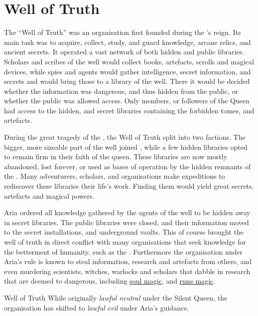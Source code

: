 \section{Well of Truth}
\label{sec:Well of Truth}

The ``Well of Truth'' was an organisation first founded during the
's reign. Its main task was to acquire, collect,
study, and guard knowledge, arcane relics, and ancient secrets. It operated a
vast network of both hidden and public libraries. Scholars and scribes of the
well would collect books, artefacts, scrolls and magical devices, while spies
and agents would gather intelligence, secret information, and secrets and
would bring those to a library of the well. There it would be decided whether
the information was dangerous, and thus hidden from the public, or whether the
public was allowed access. Only members, or followers of the Queen had access
to the hidden, and secret libraries containing the forbidden tomes, and
artefacts.

During the great tragedy of the , the Well of Truth
split into two factions. The bigger, more sizeable part of the well joined
, while a few hidden libraries opted to remain firm in their
faith of the queen. These libraries are now mostly abandoned, lost forever, or
used as bases of operation by the hidden remnants of the . Many adventurers, scholars, and organisations make expeditions
to rediscover these libraries their life's work. Finding them would yield
great secrets, artefacts and magical powers.

Aria ordered all knowledge gathered by the agents of the well to be hidden
away in secret libraries. The public libraries were closed, and their
information moved to the secret installations, and underground vaults. This
of course brought the well of truth in direct conflict with many organisations
that seek knowledge for the betterment of humanity, such as the
. Furthermore the organisation under Aria's rule is
known to steal information, research and artefacts from others, and even
murdering scientists, witches, warlocks and scholars that dabble in research
that are deemed to dangerous, including \hyperref[sec:Soul Magic]{soul magic},
and \hyperref[sec:Rune Magic]{rune magic}.


\begin{35e}{Well of Truth}
  While originally \emph{lawful neutral} under the Silent Queen, the
  organisation has shifted to \emph{lawful evil} under Aria's guidance.
\end{35e}
